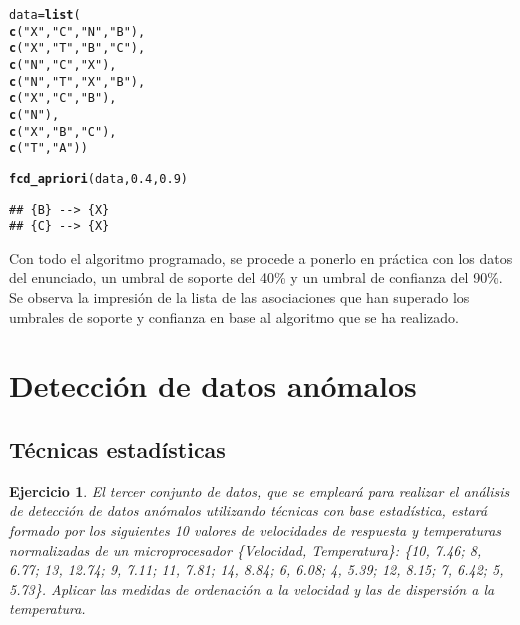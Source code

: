 \documentclass[12pt]{report}\usepackage[]{graphicx}\usepackage[dvipsnames]{xcolor}
\makeatletter
\newcommand{\hlnum}[1]{\textcolor[rgb]{0.686,0.059,0.569}{#1}}%
\newcommand{\hlstr}[1]{\textcolor[rgb]{0.192,0.494,0.8}{#1}}%
\newcommand{\hlstd}[1]{\textcolor[rgb]{0.345,0.345,0.345}{#1}}%
\newcommand{\hlkwb}[1]{\textcolor[rgb]{0.69,0.353,0.396}{#1}}%
\newcommand{\hlkwd}[1]{\textcolor[rgb]{0.737,0.353,0.396}{\textbf{#1}}}%
\newenvironment{kframe}{%
 \def\at@end@of@kframe{}%
 \ifinner\ifhmode%
  \def\at@end@of@kframe{\end{minipage}}%
  \begin{minipage}{\columnwidth}%
 \fi\fi%
 \def\FrameCommand##1{\hskip\@totalleftmargin \hskip-\fboxsep
 \colorbox{shadecolor}{##1}\hskip-\fboxsep
     \hskip-\linewidth \hskip-\@totalleftmargin \hskip\columnwidth}%
 \MakeFramed {\advance\hsize-\width
   \@totalleftmargin\z@ \linewidth\hsize
   \@setminipage}}%
 {\par\unskip\endMakeFramed%
 \at@end@of@kframe}
\newenvironment{knitrout}{}{} %
\newtheorem{exercise}{Ejercicio}[section]
\makeatother
\begin{document}
\begin{knitrout}
\color{fgcolor}\begin{kframe}
\begin{alltt}
\hlstd{data} \hlkwb{=} \hlkwd{list}\hlstd{(}
\hlkwd{c}\hlstd{(}\hlstr{"X"}\hlstd{,} \hlstr{"C"}\hlstd{,} \hlstr{"N"}\hlstd{,} \hlstr{"B"}\hlstd{),}
\hlkwd{c}\hlstd{(}\hlstr{"X"}\hlstd{,} \hlstr{"T"}\hlstd{,} \hlstr{"B"}\hlstd{,} \hlstr{"C"}\hlstd{),}
\hlkwd{c}\hlstd{(}\hlstr{"N"}\hlstd{,} \hlstr{"C"}\hlstd{,} \hlstr{"X"}\hlstd{),}
\hlkwd{c}\hlstd{(}\hlstr{"N"}\hlstd{,} \hlstr{"T"}\hlstd{,} \hlstr{"X"}\hlstd{,} \hlstr{"B"}\hlstd{),}
\hlkwd{c}\hlstd{(}\hlstr{"X"}\hlstd{,} \hlstr{"C"}\hlstd{,} \hlstr{"B"}\hlstd{),}
\hlkwd{c}\hlstd{(}\hlstr{"N"}\hlstd{),}
\hlkwd{c}\hlstd{(}\hlstr{"X"}\hlstd{,} \hlstr{"B"}\hlstd{,} \hlstr{"C"}\hlstd{),}
\hlkwd{c}\hlstd{(}\hlstr{"T"}\hlstd{,} \hlstr{"A"}\hlstd{))}

\hlkwd{fcd_apriori}\hlstd{(data,} \hlnum{0.4}\hlstd{,} \hlnum{0.9}\hlstd{)}
\end{alltt}
\begin{verbatim}
## {B} --> {X}
## {C} --> {X}
\end{verbatim}
\end{kframe}
\end{knitrout}
			
			Con todo el algoritmo programado, se procede a ponerlo en práctica con los datos del enunciado, un umbral de soporte del 40\% y un umbral de confianza del 90\%. Se observa la impresión de la lista de las asociaciones que han superado los umbrales de soporte y confianza en base al algoritmo que se ha realizado.
		
		\section{Detección de datos anómalos}
		
			\subsection{Técnicas estadísticas}
			
				\begin{exercise}
					El tercer conjunto de datos, que se empleará para realizar el análisis de detección de datos anómalos utilizando técnicas con base estadística, estará formado por los siguientes 10 valores de velocidades de respuesta y temperaturas normalizadas de un microprocesador \{Velocidad, Temperatura\}: \{10, 7.46; 8, 6.77; 13, 12.74; 9, 7.11; 11, 7.81; 14, 8.84; 6, 6.08; 4, 5.39; 12, 8.15; 7, 6.42; 5, 5.73\}. Aplicar las medidas de ordenación a la velocidad y las de dispersión a la temperatura.
				\end{exercise}
				
\end{document}
